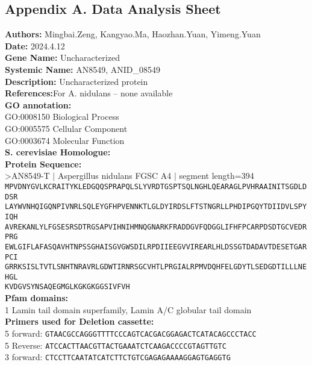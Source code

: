 \documentclass[a4paper,10pt]{article}
\begin{document}
\clearpage


\begin{appendices}
\section*{Appendix A. Data Analysis Sheet}\label{secA}

\textbf{Authors:} Mingbai.Zeng, Kangyao.Ma, Haozhan.Yuan, Yimeng.Yuan\\
\textbf{Date:} 2024.4.12\\
\textbf{Gene Name:} Uncharacterized\\
\textbf{Systemic Name:} AN8549, ANID\_08549\\
\textbf{Description:} Uncharacterized protein\\
\textbf{References:}For A. nidulans – none available\\
\textbf{GO annotation:}\\
GO:0008150 Biological Process\\
GO:0005575 Cellular Component\\
GO:0003674 Molecular Function\\
\textbf{S. cerevisiae Homologue:}\\
\textbf{Protein Sequence:}\\
\textgreater AN8549-T $\mid$ Aspergillus nidulans FGSC A4 $\mid$ segment length=394\\
\texttt{MPVDNYGVLKCRAITYKLEDGQQSPRAPQLSLYVRDTGSPTSQLNGHLQEARAGLPVHRAAINITSGDLDDSR\\
LAYWVNHQIGQNPIVNRLSQLEYGFHPVENNKTLGLDYIRDSLFTSTNGRLLPHDIPGQYTDIIDVLSPYIQH\\
AVREKANLYLFGSESRSDTRGSAPVIHNIHMNQGNARKFRADDGVFQDGGLIFHFPCARPDSDTGCVEDRPRG\\
EWLGIFLAFASQAVHTNPSSGHAISGVGWSDILRPDIIEEGVVIREARLHLDSSGTDADAVTDESETGARPCI\\
GRRKSISLTVTLSNHTNRAVRLGDWTIRNRSGCVHTLPRGIALRPMVDQHFELGDYTLSEDGDTILLLNEHGL\\
KVDGVSYNSAQEGMGLKGKGKGGSIVFVH}\\
\textbf{Pfam domains:}\\
1 Lamin tail domain superfamily, Lamin A/C globular tail domain\\
\textbf{Primers used for Deletion cassette:}\\
5 forward: \texttt{GTAACGCCAGGGTTTTCCCAGTCACGACGGAGACTCATACAGCCCTACC}\\
5 Reverse: \texttt{ATCCACTTAACGTTACTGAAATCTCAAGACCCCGTAGTTGTC}\\
3 forward: \texttt{CTCCTTCAATATCATCTTCTGTCGAGAGAAAAGGAGTGAGGTG}\\

\end{appendices}
\end{document}
